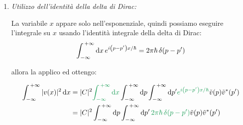 \begin{myprf}
\begin{enumerate}[label=\arabic*)]
	\begin{align*}
		\abs{C \int_{-\infty}^{\, +\infty} \dd p  \, e^{ipx/\hbar} \, \tilde{v}(p) }^2 &= |v(x)|^2 = v(x) \, v^*(x) \\
	&= \qty(C \int_{-\infty}^{\, +\infty} \dd p  \, e^{ipx/\hbar} \, \tilde{v}(p)) \, \qty(C \int_{-\infty}^{\, +\infty} \dd p'  \, e^{ip'x/\hbar} \, \tilde{v}(p'))^{\textcolor{blue}{*}} \\
	&= \textcolor{orange}{\qty(C \int_{-\infty}^{\, +\infty} \dd p  \, e^{ipx/\hbar} \, \tilde{v}(p)) \, \qty(C^{\textcolor{blue}{*}} \int_{-\infty}^{\, +\infty} \dd p'  \, e^{\, \textcolor{blue}{-}ip'x/\hbar} \, \tilde{v}^{\textcolor{blue}{*}}(p')) } \\
	& =  |C|^2 \int_{-\infty}^{\, +\infty}  \dd p \int_{-\infty}^{\, +\infty} \dd p'  e^{i\qty(p-p')x/\hbar} \tilde{v}(p)\tilde{v}^*(p')
	\end{align*}
	
		allora posso scrivere l'espansione:
		
	\begin{align*}
		\int_{-\infty}^{\, +\infty} |v(x)|^2 \, \dd x  = |C|^2 \int_{-\infty}^{\, +\infty} \dd x \int_{-\infty}^{\, +\infty} \dd p \int_{-\infty}^{\, +\infty} \dd p'  e^{i\qty(p-p')x/\hbar} \tilde{v}(p)\tilde{v}^*(p')
	\end{align*}
		
	\item \textit{Utilizzo dell'identità della delta di Dirac:}
	
		La variabile $x$ appare solo nell'esponenziale, quindi possiamo eseguire l'integrale su $x$ usando l'identità integrale della delta di Dirac:
	\begin{align*}
		\int_{-\infty}^{\, +\infty} \dd x \, e^{i\qty(p-p')x/\hbar}  = 2\pi \hbar \, \delta\qty(p - p')
	\end{align*}
	
		allora la applico ed ottengo:
		
	\begin{align*}
		\int_{-\infty}^{\, +\infty} |v(x)|^2 \, \dd x  &= |C|^2 \textcolor{ForestGreen}{\int_{-\infty}^{\, +\infty} \dd x} \int_{-\infty}^{\, +\infty} \dd p \int_{-\infty}^{\, +\infty} \dd p'  \textcolor{ForestGreen}{e^{i\qty(p-p')x/\hbar}} \tilde{v}(p)\tilde{v}^*(p') \\
		&= |C|^2 \int_{-\infty}^{\, +\infty} \dd p \int_{-\infty}^{\, +\infty} \dd p'  \, \textcolor{ForestGreen}{ 2\pi \hbar \, \delta\qty(p - p')} \tilde{v}(p)\tilde{v}^*(p')
	\end{align*}
	

\end{enumerate}
\end{myprf}
